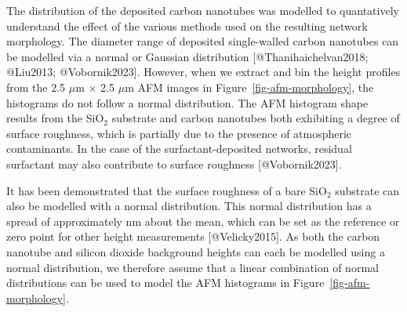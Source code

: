 \documentclass[
  letterpaper,
  DIV=11,
  numbers=noendperiod]{scrartcl}
\begin{document}
The distribution of the deposited carbon nanotubes was modelled to
quantatively understand the effect of the various methods used on the
resulting network morphology. The diameter range of deposited
single-walled carbon nanotubes can be modelled via a normal or Gaussian
distribution {[}@Thanihaichelvan2018; @Liu2013; @Vobornik2023{]}.
However, when we extract and bin the height profiles from the 2.5
\(\mu\)m \(\times\) 2.5 \(\mu\)m AFM images in
Figure~\ref{fig-afm-morphology}, the histograms do not follow a normal
distribution. The AFM histogram shape results from the SiO\(_2\)
substrate and carbon nanotubes both exhibiting a degree of surface
roughness, which is partially due to the presence of atmospheric
contaminants. In the case of the surfactant-deposited networks, residual
surfactant may also contribute to surface roughness {[}@Vobornik2023{]}.

It has been demonstrated that the surface roughness of a bare SiO\(_2\)
substrate can also be modelled with a normal distribution. This normal
distribution has a spread of approximately  nm about the mean, which
can be set as the reference or zero point for other height measurements
{[}@Velicky2015{]}. As both the carbon nanotube and silicon dioxide
background heights can each be modelled using a normal distribution, we
therefore assume that a linear combination of normal distributions can
be used to model the AFM histograms in Figure~\ref{fig-afm-morphology}.
\end{document}
